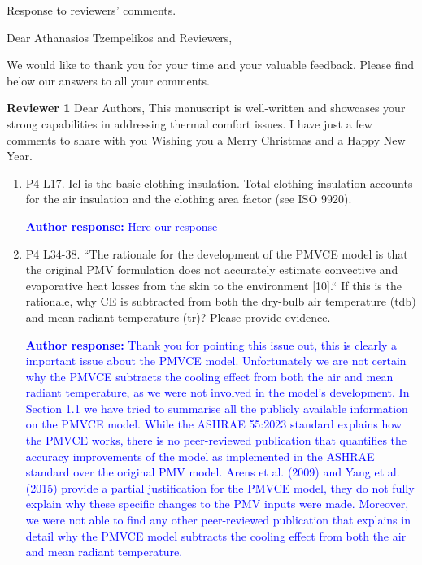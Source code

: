 \documentclass[a4paper, 10pt]{letter}
\newcommand{\response}[1]{\textcolor{blue}{\textbf{Author response:} #1}}
\begin{document}
    \begin{letter}
    {
        Response to reviewers' comments.
    }

        \opening{Dear Athanasios Tzempelikos and Reviewers,}


        We would like to thank you for your time and your valuable feedback.
        Please find below our answers to all your comments.

        \textbf{Reviewer 1}
        Dear Authors,
        This manuscript is well-written and showcases your strong capabilities in addressing thermal comfort issues.
        I have just a few comments to share with you Wishing you a Merry Christmas and a Happy New Year.

        \begin{enumerate}

            \item P4 L17.
            Icl is the basic clothing insulation.
            Total clothing insulation accounts for the air insulation and the clothing area factor (see ISO 9920).

            \response{
                Here our response
            }

            \item P4 L34-38.
            ``The rationale for the development of the PMVCE model is that the original PMV
            formulation does not accurately estimate convective and evaporative heat losses from
            the skin to the environment [10].`` If this is the rationale, why CE is subtracted from both
            the dry-bulb air temperature (tdb) and mean radiant temperature (tr)?
            Please provide evidence.

            \response{
                Thank you for pointing this issue out, this is clearly a important issue about the PMVCE model.
                Unfortunately we are not certain why the PMVCE subtracts the cooling effect from both the air and mean radiant temperature, as we were not involved in the model's development.
                In Section 1.1 we have tried to summarise all the publicly available information on the PMVCE model.
                While the ASHRAE 55:2023 standard explains how the PMVCE works, there is no peer-reviewed publication that quantifies the accuracy improvements of the model as implemented in the ASHRAE standard over the original PMV model.
                Arens et al. (2009) and Yang et al. (2015) provide a partial justification for the PMVCE model, they do not fully explain why these specific changes to the PMV inputs were made.
                Moreover, we were not able to find any other peer-reviewed publication that explains in detail why the PMVCE model subtracts the cooling effect from both the air and mean radiant temperature.
            }


\end{enumerate}
\end{letter}
\end{document}
